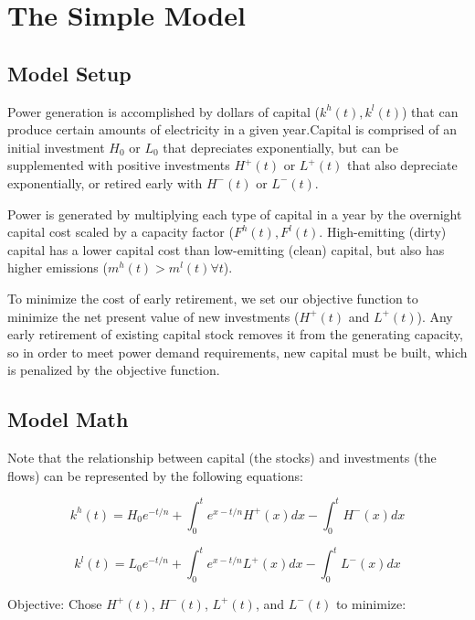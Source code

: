 \documentclass[singlespace]{easychithesis}
\begin{document}

\chapter{The Simple Model}
\section{Model Setup}

Power generation is accomplished by dollars of capital ($k^h(t), k^l(t)$) that can produce certain amounts of electricity in a given year.Capital is comprised of an initial investment $H_0$ or $L_0$ that depreciates exponentially, but can be supplemented with positive investments $H^+(t)$ or $L^+(t)$ that also depreciate exponentially, or retired early with $H^-(t)$ or $L^-(t)$. 

Power is generated by multiplying each type of capital in a year by the overnight capital cost scaled by a capacity factor ($F^h(t), F^l(t)$. High-emitting (dirty) capital has a lower capital cost than low-emitting (clean) capital, but also has higher emissions ($m^h(t) > m^l(t) \forall t$). 

To minimize the cost of early retirement, we set our objective function to minimize the net present value of new investments ($H^+(t)$ and $L^+(t)$). Any early retirement of existing capital stock removes it from the generating capacity, so in order to meet power demand requirements, new capital must be built, which is penalized by the objective function. 


\section{Model Math}

Note that the relationship between capital (the stocks) and investments (the flows) can be represented by the following equations:

\begin{equation}
k^h(t) = H_0 e^{-t/n} + \int_0^t e^{x-t/n} H^+(x) dx - \int_0^t H^-(x)dx
\end{equation}

\begin{equation}
k^l(t) = L_0 e^{-t/n} + \int_0^t e^{x-t/n} L^+(x) dx - \int_0^t L^-(x)dx
\end{equation}

Objective: Chose $H^+(t)$, $H^-(t)$, $L^+(t)$, and $L^-(t)$ to minimize:
\end{document}
